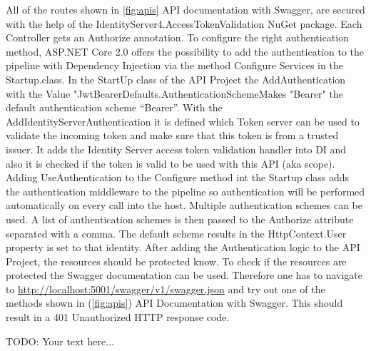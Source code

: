 All of the routes shown in \ref{fig:apis} API documentation with Swagger, are secured with the help of the IdentityServer4.AccessTokenValidation NuGet package. Each Controller gets an Authorize annotation. 
To configure the right authentication method, ASP.NET Core 2.0 offers the possibility to add the authentication to the pipeline with Dependency Injection via the method Configure Services in the Startup.class.
In the StartUp class of the API Project the AddAuthentication with the Value "JwtBearerDefaults.AuthenticationSchemeMakes "Bearer" the default authentication scheme “Bearer”. With the AddIdentityServerAuthentication it is defined which Token server can be used to validate the incoming token and make sure that this token is from a trusted issuer. It adds the Identity Server access token validation handler into DI and also it is checked if the token is valid to be used with this API (aka scope). Adding UseAuthentication to the Configure method int the Startup class adds the authentication middleware to the pipeline so authentication will be performed automatically on every call into the host.  Multiple authentication schemes can be used. A list of authentication schemes is then passed to the Authorize attribute separated with a comma. The default scheme results in the HttpContext.User property is set to that identity. After adding the Authentication logic to the API Project, the resources should be protected know. To check if the resources are protected the Swagger documentation can be used. Therefore one has to navigate to \url{http://localhost:5001/swagger/v1/swagger.json} and try out one of the methods shown in (\ref{fig:apis}) API Documentation with Swagger. This should result in a 401 Unauthorized HTTP response code.

 

TODO: Your text here...

\chapterend
